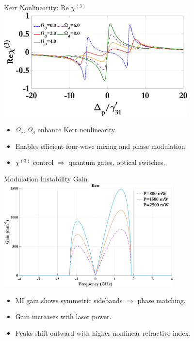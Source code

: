 \documentclass[12pt,aspectratio=1610]{beamer}
\begin{document}
\begin{frame}{Kerr Nonlinearity: Re $\chi^{(3)}$}
  \vspace{-10pt}
  \hspace*{36pt}
  \includegraphics[width=0.75\textwidth]{Assets/Real_chi3_Omega_d.jpeg}
  \begin{itemize}
    \item $\Omega_c$, $\Omega_d$ enhance Kerr nonlinearity.
    \item Enables efficient four-wave mixing and phase modulation.
    \item $\chi^{(3)}$ control $\Rightarrow$ quantum gates, optical switches.
  \end{itemize}
\end{frame}

\begin{frame}{Modulation Instability Gain}
  \hspace*{40pt}
  \includegraphics[width=0.69\textwidth]{Assets/G_v_Power.jpeg}
  \begin{itemize}
    \item MI gain shows symmetric sidebands $\Rightarrow$ phase matching.
    \item Gain increases with laser power.
    \item Peaks shift outward with higher nonlinear refractive index.
  \end{itemize}
\end{frame}
\end{document}
